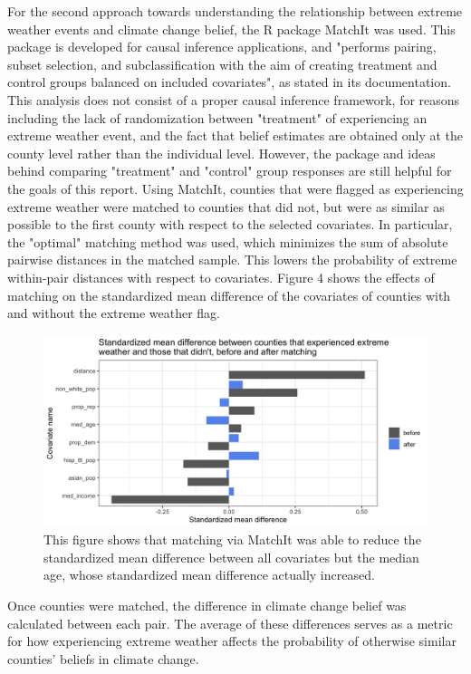\documentclass{article}
\begin{document}
For the second approach towards understanding the relationship between extreme weather events and climate change belief, the R package MatchIt was used. This package is developed for causal inference applications, and "performs pairing, subset selection, and subclassification with the aim of creating treatment and control groups balanced on included covariates", as stated in its documentation. This analysis does not consist of a proper causal inference framework, for reasons including the lack of randomization between "treatment" of experiencing an extreme weather event, and the fact that belief estimates are obtained only at the county level rather than the individual level. However, the package and ideas behind comparing "treatment" and "control" group responses are still helpful for the goals of this report. Using MatchIt, counties that were flagged as experiencing extreme weather were matched to counties that did not, but were as similar as possible to the first county with respect to the selected covariates. In particular, the "optimal" matching method was used, which minimizes the sum of absolute pairwise distances in the matched sample. This lowers the probability of extreme within-pair distances with respect to covariates. Figure 4 shows the effects of matching on the standardized mean difference of the covariates of counties with and without the extreme weather flag.

\begin{figure}[H]
\centering
\includegraphics[scale = 0.2]{images/matching_balance_plot.png}
\caption{This figure shows that matching via MatchIt was able to reduce the standardized mean difference between all covariates but the median age, whose standardized mean difference actually increased.}
\end{figure}

Once counties were matched, the difference in climate change belief was calculated between each pair. The average of these differences serves as a metric for how experiencing extreme weather affects the probability of otherwise similar counties' beliefs in climate change.
\end{document}
